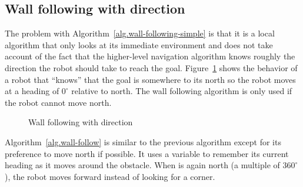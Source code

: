 \subsection{Wall following with direction}

The problem with Algorithm~\ref{alg.wall-following-simple} is that it is a local algorithm that only looks at its immediate environment and does not take account of the fact that the higher-level navigation algorithm knows roughly the direction the robot should take to reach the goal. Figure~\ref{fig.wall-following-direction} shows the behavior of a robot that ``knows'' that the goal is somewhere to its north so the robot moves at a heading of $0^\circ$ relative to north. The wall following algorithm is only used if the robot cannot move north.

\begin{figure}
\begin{center}
\caption{Wall following with direction}\label{fig.wall-following-direction}
\end{center}
\end{figure}

Algorithm~\ref{alg.wall-follow} is similar to the previous algorithm except for its preference to move north if possible. It uses a variable  to remember its current heading as it moves around the obstacle. When  is again north (a multiple of $360^\circ$), the robot moves forward instead of looking for a corner.

